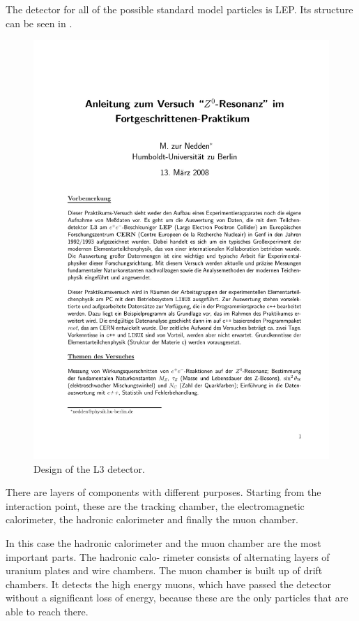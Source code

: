 \documentclass[epj,nopacs]{svjour}
\begin{document}
The detector for all of the possible standard model particles is LEP. Its
structure can be seen in .
\begin{figure}[htb]
 \centering
 \includegraphics[page=5,viewport=286 620 508 765,clip,%
  width=\columnwidth,keepaspectratio]{../../Z0/docs/Z0ResFprakt}
 \caption{Design of the L3 detector.}%
 \label{fig:aufbau}
\end{figure}
There are layers of components with different purposes. Starting from the
interaction point, these are the tracking chamber, the electromagnetic
calorimeter, the hadronic calorimeter and finally the muon chamber.

In this case the hadronic calorimeter and the muon chamber are the most
important parts. The hadronic calo- rimeter consists of alternating layers of
uranium plates and wire chambers. The muon chamber is built up of drift
chambers. It detects the high energy muons, which have passed the detector
without a significant loss of energy, because these are the only particles that
are able to reach there.
\end{document}
